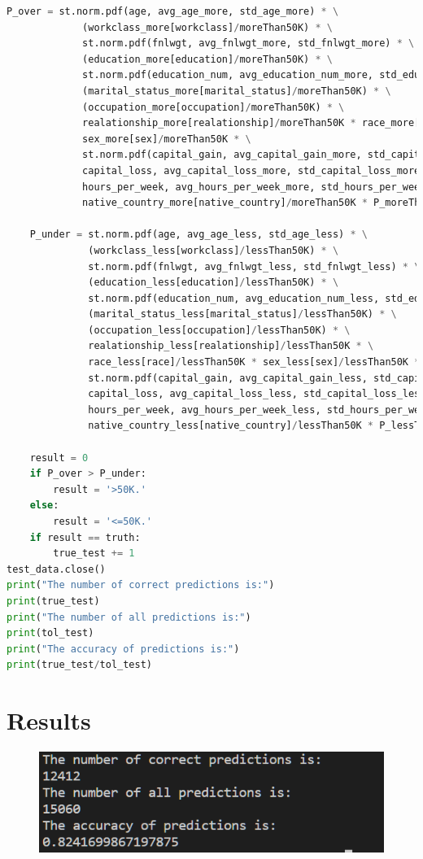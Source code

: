 ﻿\documentclass[a4paper, 11pt]{article}
\begin{document}
\begin{lstlisting}[language=Python,frame=single]
    P_over = st.norm.pdf(age, avg_age_more, std_age_more) * \
             (workclass_more[workclass]/moreThan50K) * \
             st.norm.pdf(fnlwgt, avg_fnlwgt_more, std_fnlwgt_more) * \
             (education_more[education]/moreThan50K) * \
             st.norm.pdf(education_num, avg_education_num_more, std_education_num_more) * \
             (marital_status_more[marital_status]/moreThan50K) * \
             (occupation_more[occupation]/moreThan50K) * \
             realationship_more[realationship]/moreThan50K * race_more[race]/moreThan50K * \
             sex_more[sex]/moreThan50K * \
             st.norm.pdf(capital_gain, avg_capital_gain_more, std_capital_gain_more) * st.norm.pdf(
             capital_loss, avg_capital_loss_more, std_capital_loss_more) * st.norm.pdf(
             hours_per_week, avg_hours_per_week_more, std_hours_per_week_more) * \
             native_country_more[native_country]/moreThan50K * P_moreThan50K

    P_under = st.norm.pdf(age, avg_age_less, std_age_less) * \
              (workclass_less[workclass]/lessThan50K) * \
              st.norm.pdf(fnlwgt, avg_fnlwgt_less, std_fnlwgt_less) * \
              (education_less[education]/lessThan50K) * \
              st.norm.pdf(education_num, avg_education_num_less, std_education_num_less) * \
              (marital_status_less[marital_status]/lessThan50K) * \
              (occupation_less[occupation]/lessThan50K) * \
              realationship_less[realationship]/lessThan50K * \
              race_less[race]/lessThan50K * sex_less[sex]/lessThan50K * \
              st.norm.pdf(capital_gain, avg_capital_gain_less, std_capital_gain_less) * st.norm.pdf(
              capital_loss, avg_capital_loss_less, std_capital_loss_less) * st.norm.pdf(
              hours_per_week, avg_hours_per_week_less, std_hours_per_week_less) * \
              native_country_less[native_country]/lessThan50K * P_lessThan50K

    result = 0
    if P_over > P_under:
        result = '>50K.'
    else:
        result = '<=50K.'
    if result == truth:
        true_test += 1
test_data.close()
print("The number of correct predictions is:")
print(true_test)
print("The number of all predictions is:")
print(tol_test)
print("The accuracy of predictions is:")
print(true_test/tol_test)

\end{lstlisting}
\section{Results}
\begin{figure}[h]
  \centering

  \includegraphics[width=14cm]{result.png}
\end{figure}
%
%
\end{document}
